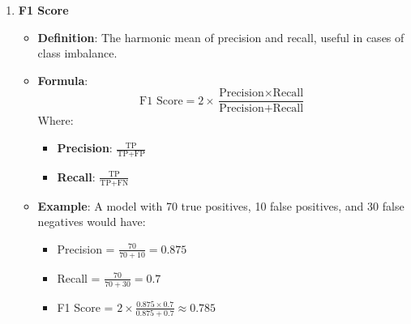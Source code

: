 \documentclass[aspectratio=169]{beamer}
\begin{document}
\begin{frame}[fragile]
\begin{enumerate}
        \item \textbf{F1 Score}
        \begin{itemize}
            \item \textbf{Definition}: The harmonic mean of precision and recall, useful in cases of class imbalance.
            \item \textbf{Formula}:
            \begin{equation}
                \text{F1 Score} = 2 \times \frac{\text{Precision} \times \text{Recall}}{\text{Precision} + \text{Recall}}
            \end{equation}
            Where:
            \begin{itemize}
                \item \textbf{Precision}: \( \frac{\text{TP}}{\text{TP} + \text{FP}} \)
                \item \textbf{Recall}: \( \frac{\text{TP}}{\text{TP} + \text{FN}} \)
            \end{itemize}
            \item \textbf{Example}: A model with 70 true positives, 10 false positives, and 30 false negatives would have:
            \begin{itemize}
                \item Precision = \( \frac{70}{70 + 10} = 0.875 \)
                \item Recall = \( \frac{70}{70 + 30} = 0.7 \)
                \item F1 Score = \( 2 \times \frac{0.875 \times 0.7}{0.875 + 0.7} \approx 0.785 \)
            \end{itemize}
        \end{itemize}
    \end{enumerate}
\end{frame}
\end{document}
